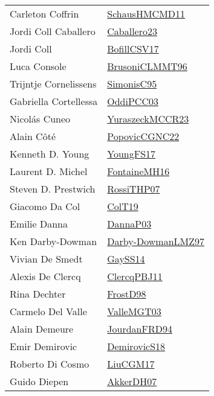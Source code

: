 {\begin{longtable}{p{4cm}p{20cm}}
Carleton Coffrin & \href{articles/SchausHMCMD11.pdf}{SchausHMCMD11}\cite{SchausHMCMD11} \\
Jordi Coll Caballero & \href{articles/Caballero23.pdf}{Caballero23}\cite{Caballero23} \\
Jordi Coll & \href{papers/BofillCSV17.pdf}{BofillCSV17}\cite{BofillCSV17} \\
Luca Console & \href{papers/BrusoniCLMMT96.pdf}{BrusoniCLMMT96}\cite{BrusoniCLMMT96} \\
Trijntje Cornelissens & \href{papers/SimonisC95.pdf}{SimonisC95}\cite{SimonisC95} \\
Gabriella Cortellessa & \href{papers/OddiPCC03.pdf}{OddiPCC03}\cite{OddiPCC03} \\
Nicol{\'{a}}s Cuneo & \href{articles/YuraszeckMCCR23.pdf}{YuraszeckMCCR23}\cite{YuraszeckMCCR23} \\
Alain C{\^{o}}t{\'{e}} & \href{papers/PopovicCGNC22.pdf}{PopovicCGNC22}\cite{PopovicCGNC22} \\
Kenneth D. Young & \href{papers/YoungFS17.pdf}{YoungFS17}\cite{YoungFS17} \\
Laurent D. Michel & \href{papers/FontaineMH16.pdf}{FontaineMH16}\cite{FontaineMH16} \\
Steven D. Prestwich & \href{papers/RossiTHP07.pdf}{RossiTHP07}\cite{RossiTHP07} \\
Giacomo Da Col & \href{papers/ColT19.pdf}{ColT19}\cite{ColT19} \\
Emilie Danna & \href{papers/DannaP03.pdf}{DannaP03}\cite{DannaP03} \\
Ken Darby{-}Dowman & \href{articles/Darby-DowmanLMZ97.pdf}{Darby-DowmanLMZ97}\cite{Darby-DowmanLMZ97} \\
Vivian De Smedt & \href{papers/GaySS14.pdf}{GaySS14}\cite{GaySS14} \\
Alexis De Clercq & \href{papers/ClercqPBJ11.pdf}{ClercqPBJ11}\cite{ClercqPBJ11} \\
Rina Dechter & \href{papers/FrostD98.pdf}{FrostD98}\cite{FrostD98} \\
Carmelo Del Valle & \href{papers/ValleMGT03.pdf}{ValleMGT03}\cite{ValleMGT03} \\
Alain Demeure & \href{}{JourdanFRD94}\cite{JourdanFRD94} \\
Emir Demirovic & \href{papers/DemirovicS18.pdf}{DemirovicS18}\cite{DemirovicS18} \\
Roberto Di Cosmo & \href{papers/LiuCGM17.pdf}{LiuCGM17}\cite{LiuCGM17} \\
Guido Diepen & \href{papers/AkkerDH07.pdf}{AkkerDH07}\cite{AkkerDH07} \\

\end{longtable}}
